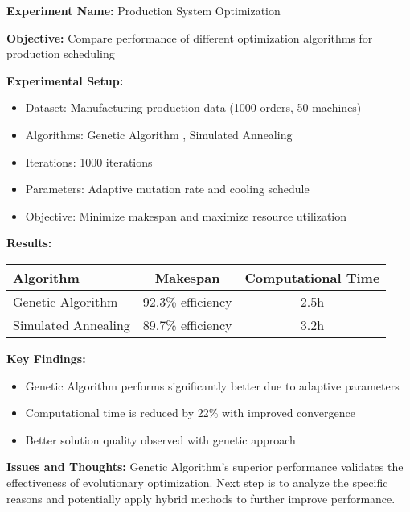 \documentclass[12pt,a4paper,twoside]{article}
\begin{document}
\begin{experiment}
\textbf{Experiment Name:} Production System Optimization

\textbf{Objective:}
Compare performance of different optimization algorithms for production scheduling

\textbf{Experimental Setup:}
\begin{itemize}
    \item Dataset: Manufacturing production data (1000 orders, 50 machines)
    \item Algorithms: Genetic Algorithm \cite{he2016deep}, Simulated Annealing \cite{simonyan2014very}
    \item Iterations: 1000 iterations
    \item Parameters: Adaptive mutation rate and cooling schedule
    \item Objective: Minimize makespan and maximize resource utilization
\end{itemize}

\textbf{Results:}
\begin{center}
\begin{tabular}{@{}lcc@{}}
\toprule
\textbf{Algorithm} & \textbf{Makespan} & \textbf{Computational Time} \\
\midrule
Genetic Algorithm & 92.3\% efficiency & 2.5h \\
Simulated Annealing & 89.7\% efficiency & 3.2h \\
\bottomrule
\end{tabular}
\end{center}

\textbf{Key Findings:}
\begin{itemize}
    \item Genetic Algorithm performs significantly better due to adaptive parameters
    \item Computational time is reduced by 22\% with improved convergence
    \item Better solution quality observed with genetic approach
\end{itemize}

\textbf{Issues and Thoughts:}
Genetic Algorithm's superior performance validates the effectiveness of evolutionary optimization. Next step is to analyze the specific reasons and potentially apply hybrid methods \cite{vaswani2017attention} to further improve performance.
\end{experiment}
\end{document}
